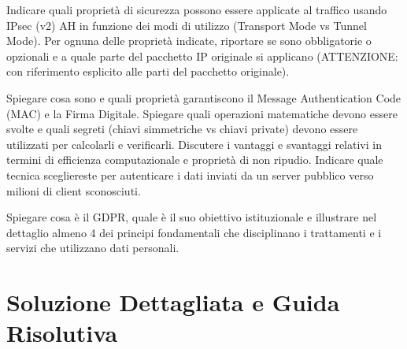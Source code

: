 \documentclass[11pt,a4paper]{article}
\begin{document}
\begin{questionbox}
Indicare quali propriet\`a di sicurezza possono essere applicate al traffico usando IPsec (v2) AH in funzione dei modi di utilizzo (Transport Mode vs Tunnel Mode).
Per ognuna delle propriet\`a indicate, riportare se sono obbligatorie o opzionali e a quale parte del pacchetto IP originale si applicano (ATTENZIONE: con riferimento esplicito alle parti del pacchetto originale).
\end{questionbox}

\begin{questionbox}
Spiegare cosa sono e quali propriet\`a garantiscono il Message Authentication Code (MAC) e la Firma Digitale.
Spiegare quali operazioni matematiche devono essere svolte e quali segreti (chiavi simmetriche vs chiavi private) devono essere utilizzati per calcolarli e verificarli.
Discutere i vantaggi e svantaggi relativi in termini di efficienza computazionale e propriet\`a di non ripudio. Indicare quale tecnica scegliereste per autenticare i dati inviati da un server pubblico verso milioni di client sconosciuti.
\end{questionbox}

\begin{questionbox}
Spiegare cosa \`e il GDPR, quale \`e il suo obiettivo istituzionale e illustrare nel dettaglio almeno 4 dei principi fondamentali che disciplinano i trattamenti e i servizi che utilizzano dati personali.
\end{questionbox}

\newpage
\section{Soluzione Dettagliata e Guida Risolutiva}
\end{document}
